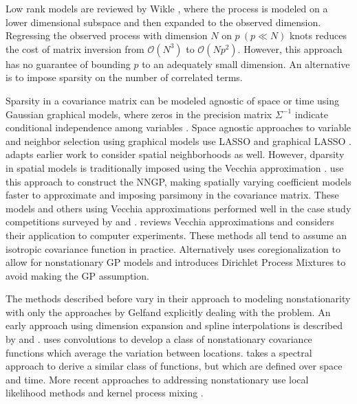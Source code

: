 \documentclass[letterpaper]{article}
\begin{document}
  Low rank models are reviewed by Wikle \citep[\S~8.3]{HandbookSpatialStats},
  where the process is modeled on a lower dimensional subspace and then expanded
  to the observed dimension. Regressing the observed process with dimension $N$
  on $p\ (p \ll N)$ knots reduces the cost of matrix inversion from $\mathcal{O}(N^3)$
  to $\mathcal{O}(N p^2)$. However, this approach has no guarantee of bounding
  $p$ to an adequately small dimension. An alternative is to impose sparsity on
  the number of correlated terms.

  Sparsity in a covariance matrix can be modeled agnostic of space or time using
  Gaussian graphical models, where zeros in the precision matrix $\Sigma^{-1}$
  indicate conditional independence among variables \citep[Chapter~3]{HandbookGraphicalModels}.
  Space agnostic approaches to variable and neighbor selection using graphical
  models use LASSO \citep{Meinshausen2006} and graphical LASSO \citep{Friedman2008}.
  \citet{Huang2010} adapts earlier work to consider spatial neighborhoods as well.
  However, dparsity in spatial models is traditionally imposed using the Vecchia
  approximation \citep{Vecchia1988,Stein2004}. \citet{Datta2016a} use this approach
  to construct the NNGP, making spatially varying coefficient models \cite{Gelfand2003}
  faster to approximate and imposing parsimony in the covariance matrix. These models
  and others using Vecchia approximations performed well in the case study
  competitions surveyed by \citet{Heaton2019} and \citet{Huang2021}. \citet{Katzfuss2021a}
  reviews Vecchia approximations and \citet{Katzfuss2020} considers their application
  to computer experiments. These methods all tend to assume an isotropic covariance
  function in practice. Alternatively \citet{Gelfand2004} uses coregionalization
  to allow for nonstationary GP models and \citet{Gelfand2005b} introduces Dirichlet
  Process Mixtures to avoid making the GP assumption.

  The methods described before vary in their approach to modeling nonstationarity
  with only the approaches by Gelfand explicitly dealing with the problem. An
  early approach using dimension expansion and spline interpolations is described
  by \citet{Sampson1992} and \citet{Damian2001}. \citet{Paciorek2006} uses convolutions
  to develop a class of nonstationary covariance functions which average the variation
  between locations. \cite{Fuentes2008} takes a spectral approach to derive a
  similar class of functions, but which are defined over space and time. More
  recent approaches to addressing nonstationary use local likelihood methods
  \citep{Anderes2011} and kernel process mixing \citep{Fuentes2013}.
  
\end{document}
